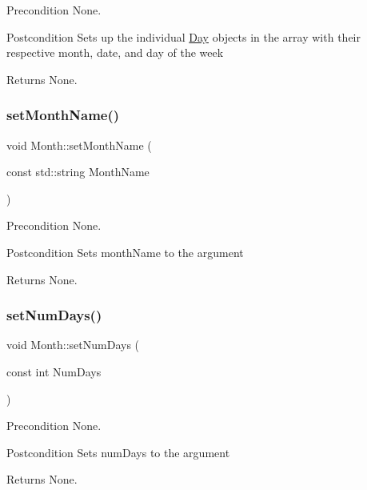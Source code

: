 \begin{DoxyPrecond}{Precondition}
None. 
\end{DoxyPrecond}
\begin{DoxyPostcond}{Postcondition}
Sets up the individual \hyperlink{class_day}{Day} objects in the array with their respective month, date, and day of the week 
\end{DoxyPostcond}
\begin{DoxyReturn}{Returns}
None. 
\end{DoxyReturn}
\hypertarget{class_month_a77dee92af5de872d8579b1b142473f90}{}\label{class_month_a77dee92af5de872d8579b1b142473f90} 
\subsubsection{\texorpdfstring{set\+Month\+Name()}{setMonthName()}}
{\footnotesize\ttfamily void Month\+::set\+Month\+Name (\begin{DoxyParamCaption}\item[{const std\+::string}]{Month\+Name }\end{DoxyParamCaption})}

\begin{DoxyPrecond}{Precondition}
None. 
\end{DoxyPrecond}
\begin{DoxyPostcond}{Postcondition}
Sets month\+Name to the argument 
\end{DoxyPostcond}
\begin{DoxyReturn}{Returns}
None. 
\end{DoxyReturn}
\hypertarget{class_month_a661a751213b495884ec258d3e6c687e9}{}\label{class_month_a661a751213b495884ec258d3e6c687e9} 
\subsubsection{\texorpdfstring{set\+Num\+Days()}{setNumDays()}}
{\footnotesize\ttfamily void Month\+::set\+Num\+Days (\begin{DoxyParamCaption}\item[{const int}]{Num\+Days }\end{DoxyParamCaption})}

\begin{DoxyPrecond}{Precondition}
None. 
\end{DoxyPrecond}
\begin{DoxyPostcond}{Postcondition}
Sets num\+Days to the argument 
\end{DoxyPostcond}
\begin{DoxyReturn}{Returns}
None. 
\end{DoxyReturn}
\hypertarget{class_month_ae9730715451148a5a4629b9c450e8103}{}\label{class_month_ae9730715451148a5a4629b9c450e8103} 
